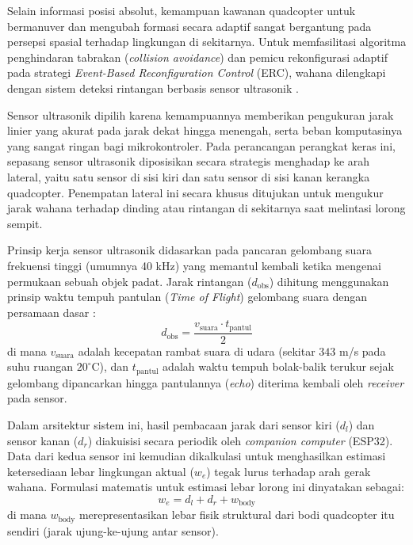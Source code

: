 \documentclass[12pt,a4paper]{report}
\numberwithin{equation}{chapter}
\begin{document}
Selain informasi posisi absolut, kemampuan kawanan quadcopter untuk bermanuver dan mengubah formasi secara adaptif sangat bergantung pada persepsi spasial terhadap lingkungan di sekitarnya. Untuk memfasilitasi algoritma penghindaran tabrakan (\textit{collision avoidance}) dan pemicu rekonfigurasi adaptif pada strategi \textit{Event-Based Reconfiguration Control} (ERC), wahana dilengkapi dengan sistem deteksi rintangan berbasis sensor ultrasonik \cite{siegwartIntroductionAutonomousMobile2004}.

Sensor ultrasonik dipilih karena kemampuannya memberikan pengukuran jarak linier yang akurat pada jarak dekat hingga menengah, serta beban komputasinya yang sangat ringan bagi mikrokontroler. Pada perancangan perangkat keras ini, sepasang sensor ultrasonik diposisikan secara strategis menghadap ke arah lateral, yaitu satu sensor di sisi kiri dan satu sensor di sisi kanan kerangka quadcopter. Penempatan lateral ini secara khusus ditujukan untuk mengukur jarak wahana terhadap dinding atau rintangan di sekitarnya saat melintasi lorong sempit.

Prinsip kerja sensor ultrasonik didasarkan pada pancaran gelombang suara frekuensi tinggi (umumnya 40 kHz) yang memantul kembali ketika mengenai permukaan sebuah objek padat. Jarak rintangan ($d_{\text{obs}}$) dihitung menggunakan prinsip waktu tempuh pantulan (\textit{Time of Flight}) gelombang suara dengan persamaan dasar \cite{borensteinObstacleAvoidanceUltrasonic1988}:
\begin{equation}
    d_{\text{obs}} = \frac{v_{\text{suara}} \cdot t_{\text{pantul}}}{2}
\end{equation}
di mana $v_{\text{suara}}$ adalah kecepatan rambat suara di udara (sekitar $343$ m/s pada suhu ruangan $20^\circ\text{C}$), dan $t_{\text{pantul}}$ adalah waktu tempuh bolak-balik terukur sejak gelombang dipancarkan hingga pantulannya (\textit{echo}) diterima kembali oleh \textit{receiver} pada sensor.

Dalam arsitektur sistem ini, hasil pembacaan jarak dari sensor kiri ($d_l$\label{sym:dl}) dan sensor kanan ($d_r$\label{sym:dr}) diakuisisi secara periodik oleh \textit{companion computer} (ESP32). Data dari kedua sensor ini kemudian dikalkulasi untuk menghasilkan estimasi ketersediaan lebar lingkungan aktual ($w_e$\label{sym:we}) tegak lurus terhadap arah gerak wahana. Formulasi matematis untuk estimasi lebar lorong ini dinyatakan sebagai:
\begin{equation}
    w_e = d_l + d_r + w_{\text{body}}
\end{equation}
di mana $w_{\text{body}}$\label{sym:wbody} merepresentasikan lebar fisik struktural dari bodi quadcopter itu sendiri (jarak ujung-ke-ujung antar sensor). 
\end{document}
